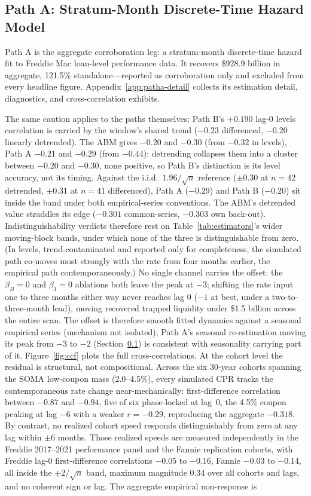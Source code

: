 \documentclass[12pt]{article}
\begin{document}
\subsection{Path A: Stratum-Month Discrete-Time Hazard Model}\label{sec:patha}

Path A is the aggregate corroboration leg: a stratum-month discrete-time hazard fit to Freddie Mac loan-level performance data. It recovers \$928.9 billion in aggregate, 121.5\% standalone---reported as corroboration only and excluded from every headline figure. Appendix~\ref{app:patha-detail} collects its estimation detail, diagnostics, and cross-correlation exhibits.

The same caution applies to the paths themselves: Path B's $+0.190$ lag-0 levels correlation is carried by the window's shared trend ($-0.23$ differenced, $-0.20$ linearly detrended). The ABM gives $-0.20$ and $-0.30$ (from $-0.32$ in levels), Path A $-0.21$ and $-0.29$ (from $-0.44$): detrending collapses them into a cluster between $-0.20$ and $-0.30$, none positive, so Path B's distinction is its level accuracy, not its timing. Against the i.i.d.\ $1.96/\sqrt{n}$ reference ($\pm 0.30$ at $n = 42$ detrended, $\pm 0.31$ at $n = 41$ differenced), Path A ($-0.29$) and Path B ($-0.20$) sit inside the band under both empirical-series conventions. The ABM's detrended value straddles its edge ($-0.301$ common-series, $-0.303$ own back-out). Indistinguishability verdicts therefore rest on Table~\ref{tab:estimators}'s wider moving-block bands, under which none of the three is distinguishable from zero. (In levels, trend-contaminated and reported only for completeness, the simulated path co-moves most strongly with the rate from four months earlier, the empirical path contemporaneously.) No single channel carries the offset: the $\beta_B = 0$ and $\beta_1 = 0$ ablations both leave the peak at $-3$; shifting the rate input one to three months either way never reaches lag 0 ($-1$ at best, under a two-to-three-month lead), moving recovered trapped liquidity under \$1.5 billion across the entire scan. The offset is therefore smooth fitted dynamics against a seasonal empirical series (mechanism not isolated); Path A's seasonal re-estimation moving its peak from $-3$ to $-2$ (Section~\ref{sec:patha}) is consistent with seasonality carrying part of it. Figure~\ref{fig:ccf} plots the full cross-correlations. At the cohort level the residual is structural, not compositional. Across the six 30-year cohorts spanning the SOMA low-coupon mass (2.0--4.5\%), every simulated CPR tracks the contemporaneous rate change near-mechanically: first-difference correlation between $-0.87$ and $-0.94$, five of six phase-locked at lag~0, the 4.5\% coupon peaking at lag $-6$ with a weaker $r=-0.29$, reproducing the aggregate $-0.318$. By contrast, no realized cohort speed responds distinguishably from zero at any lag within $\pm 6$ months. Those realized speeds are measured independently in the Freddie 2017--2021 performance panel and the Fannie replication cohorts, with Freddie lag-0 first-difference correlations $-0.05$ to $-0.16$, Fannie $-0.03$ to $-0.14$, all inside the $\pm 2/\sqrt{n}$ band, maximum magnitude $0.34$ over all cohorts and lags, and no coherent sign or lag. The aggregate empirical non-response is 
\end{document}
